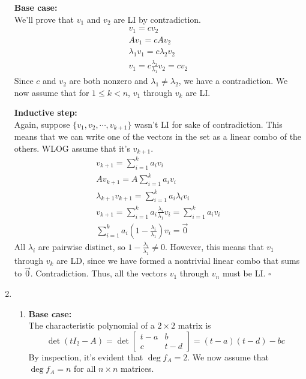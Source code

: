 \documentclass[12pt]{article}
\begin{document}
\begin{enumerate}
            \textbf{Base case:} \\
            We'll prove that $v_1$ and $v_2$ are LI by contradiction.
            \begin{gather*}
                  v_1=c v_2 \\
                  Av_1=c Av_2 \\
                  \lambda_1 v_1=c \lambda_2 v_2 \\
                  v_1=c \frac{\lambda_2}{\lambda_1} v_2=c v_2
            \end{gather*}
            Since $c$ and $v_2$ are both nonzero and $\lambda_1 \ne \lambda_2$, we have a contradiction.
            We now assume that for $1 \le k < n$, $v_1$ through $v_k$ are LI.

            \textbf{Inductive step:} \\
            Again, suppose $\{v_1, v_2, \cdots,  v_{k+1}\}$ wasn't LI for sake of contradiction.
            This means that we can write one of the vectors in the set as a linear combo of the others.
            WLOG assume that it's $v_{k+1}$.
            \begin{gather*}
                  v_{k+1}=\sum_{i=1}^{k} a_i v_i \\
                  Av_{k+1}=A \sum_{i=1}^{k} a_i v_i \\
                  \lambda_{k+1}v_{k+1} = \sum_{i=1}^{k} a_i \lambda_i v_i \\
                  v_{k+1} = \sum_{i=1}^{k} a_i \frac{\lambda_i}{\lambda_1} v_i=\sum_{i=1}^{k} a_i v_i \\
                  \sum_{i=1}^{k} a_i\left(1-\frac{\lambda_i}{\lambda_1}\right)v_i=\vec{0}
            \end{gather*}
            All $\lambda_i$ are pairwise distinct, so $1-\frac{\lambda_i}{\lambda_1} \ne 0$.
            However, this means that $v_1$ through $v_k$ are LD, since we have formed a nontrivial linear combo that sums to $\vec{0}$.
            Contradiction.
            Thus, all the vectors $v_1$ through $v_n$ must be LI. $\square$ \label{list:9}
      \item \begin{enumerate}
                  \item \textbf{Base case:} \\
                        The characteristic polynomial of a $2 \times 2$ matrix is
                        \[\det (tI_2 - A)= \det \begin{bmatrix}
                                    t-a & b   \\
                                    c   & t-d
                              \end{bmatrix}=(t-a)(t-d)-bc\]
                        By inspection, it's evident that $\deg f_A=2$.
                        We now assume that $\deg f_A=n$ for all $n \times n$ matrices.


\end{enumerate}
\end{enumerate}
\end{document}
